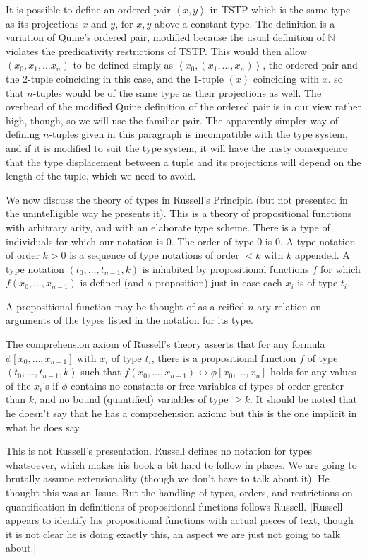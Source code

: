 \documentclass[12pt]{article}
\begin{document}
It is possible to define an ordered pair $\left<x,y\right>$ in TSTP which is the same type as its projections
$x$ and $y$, for $x,y$ above a constant type.  The definition is a variation of Quine's ordered pair, modified
because the usual definition of $\mathbb N$ violates the predicativity restrictions of TSTP.  This would then allow
$(x_0,x_1,\ldots x_n)$ to be defined simply as $\left<x_0,(x_1,\ldots,x_n)\right>$, the ordered pair and the 2-tuple coinciding in this case, and the 1-tuple $(x)$ coinciding with $x$. so that $n$-tuples would be of the same type as their projections as well.  The overhead of the modified Quine definition of the ordered pair is in our view rather high, though, so we will use the familiar pair.  The apparently simpler way of defining $n$-tuples given in this paragraph is
incompatible with the type system, and if it is modified to suit the type system, it will have the nasty consequence
that the type displacement between a tuple and its projections will depend on the length of the tuple, which we need to avoid.

We now discuss the theory of types in Russell's Principia (but not presented in the unintelligible way he presents it).  This is a theory of propositional functions with arbitrary arity, and with an elaborate type scheme.  There is a type of individuals for which our notation is 0.  The order of type 0 is 0.
A type notation of order $k>0$ is a sequence of type notations of order $<k$ with $k$ appended.  A type notation
$(t_0,\ldots,t_{n-1},k)$ is inhabited by propositional functions $f$ for which $f(x_0,\ldots,x_{n-1})$ is defined (and a proposition) just in case each $x_i$ is of type $t_i$. 

A propositional function may be thought of as a reified $n$-ary relation on arguments of the types listed in the notation for its type.

The comprehension axiom of Russell's theory asserts that for any formula $\phi[x_0,\ldots,x_{n-1}]$ with $x_i$ of type $t_i$, there is
a propositional function $f$ of type $(t_0,\ldots,t_{n-1},k)$ such that $f(x_0,\ldots,x_{n-1}) \leftrightarrow \phi[x_0,\ldots,x_n]$ holds for any values of the $x_i$'s if $\phi$ contains no constants or free variables of types of order
greater than $k$, and no bound (quantified) variables of type $\geq k$.  It should be noted that he doesn't say that he has a comprehension axiom:  but this is the one implicit in what he does say.

This is not Russell's presentation.  Russell defines no notation for types whatsoever, which makes his book a bit hard to follow in places.  We are going to brutally assume extensionality (though we don't have to talk about it).  He thought this was an Issue.  But the handling of types, orders, and restrictions on quantification in definitions of propositional functions follows Russell.  [Russell appears to identify his propositional functions with actual pieces of text, though it is not clear he is doing exactly this, an aspect we are just not going to talk about.]
\end{document}
